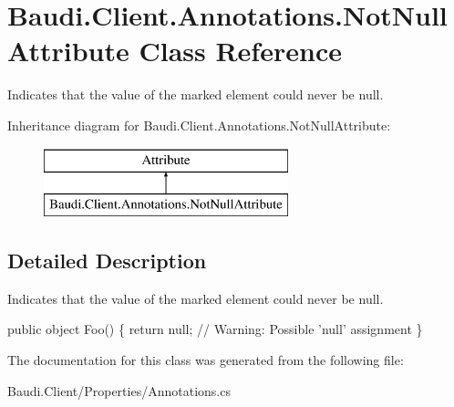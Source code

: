 \hypertarget{class_baudi_1_1_client_1_1_annotations_1_1_not_null_attribute}{}\section{Baudi.\+Client.\+Annotations.\+Not\+Null\+Attribute Class Reference}
\label{class_baudi_1_1_client_1_1_annotations_1_1_not_null_attribute}


Indicates that the value of the marked element could never be {\ttfamily null}.  


Inheritance diagram for Baudi.\+Client.\+Annotations.\+Not\+Null\+Attribute\+:\begin{figure}[H]
\begin{center}
\leavevmode
\includegraphics[height=2.000000cm]{class_baudi_1_1_client_1_1_annotations_1_1_not_null_attribute}
\end{center}
\end{figure}


\subsection{Detailed Description}
Indicates that the value of the marked element could never be {\ttfamily null}. 


\begin{DoxyCode}
[NotNull] \textcolor{keyword}{public} \textcolor{keywordtype}{object} Foo() \{
  \textcolor{keywordflow}{return} null; \textcolor{comment}{// Warning: Possible 'null' assignment}
\}
\end{DoxyCode}


The documentation for this class was generated from the following file\+:\begin{DoxyCompactItemize}
\item 
Baudi.\+Client/\+Properties/Annotations.\+cs\end{DoxyCompactItemize}
